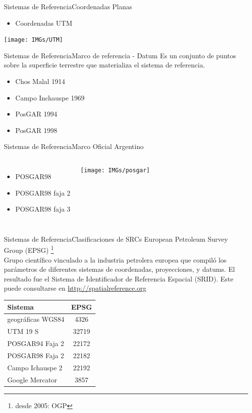 \documentclass{beamer}
\begin{document}
\begin{frame}{Sistemas de Referencia}{Coordenadas Planas}
		\begin{itemize}
			\item Coordenadas UTM
		\end{itemize}
		\texttt{[image: IMGs/UTM]}
\end{frame}

\begin{frame}{Sistemas de Referencia}{Marco de referencia - Datum}
		Es un conjunto de puntos sobre la superficie terrestre que materializa el sistema de referencia.
		\begin{itemize}
			\item Chos Malal 1914
			\item Campo Inchauspe 1969
			\item PosGAR 1994
			\item PosGAR 1998
		\end{itemize}
\end{frame}

\begin{frame}{Sistemas de Referencia}{Marco Oficial Argentino}
			\begin{columns}
							\begin{itemize}
								\item  POSGAR98
								\item  POSGAR98 faja 2
								\item  POSGAR98 faja 3
							\end{itemize}
				\texttt{[image: IMGs/posgar]}
			\end{columns}

			
\end{frame}

\begin{frame}{Sistemas de Referencia}{Clasificaciones de SRCs}
	European Petroleum Survey Group (EPSG) \footnote{desde 2005: OGP}\\
	
	Grupo científico vinculado a la industria petrolera europea que compiló los parámetros de diferentes sistemas de coordenadas, proyecciones, y datums.	El resultado fue el Sistema de Identificador de Referencia Espacial (SRID). Este puede consultarse en \url{http://spatialreference.org} 
	\begin{table}
	\centering
		\begin{tabular}{l|c}
		\toprule
		Sistema           & EPSG  \\
		\midrule
		geográficas WGS84 & 4326  \\
		UTM 19 S          & 32719 \\
		POSGAR94 Faja 2   & 22172 \\
		POSGAR98 Faja 2   & 22182 \\
		Campo Ichauspe 2  & 22192 \\
		Google Mercator   & 3857 
		\bottomrule
		\end{tabular}
	\end{table}	
\end{frame}
\end{document}
